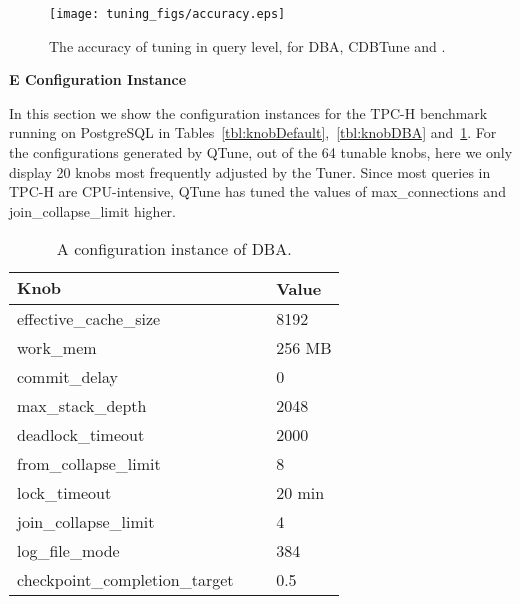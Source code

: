 \begin{figure}[htb]
\texttt{[image: tuning\_figs/accuracy.eps]}
\vspace{-2em}
\caption{The accuracy of tuning in query level, for DBA, CDBTune and \oursys .}
\label{fig:accuracy}
\vspace{-0.5em}
\end{figure} 


\vspace{1.0 em}
\noindent \textbf{\large E Configuration Instance}
\label{sec:config}

In this section we show the configuration instances for the TPC-H benchmark running on PostgreSQL in Tables~\ref{tbl:knobDefault},~\ref{tbl:knobDBA} and~\ref{tbl:knobQTune}. For the configurations generated by QTune, out of the 64 tunable knobs, here we only display 20 knobs most frequently adjusted by the Tuner. Since most queries in TPC-H are CPU-intensive,  QTune has tuned the values of max\_connections and join\_collapse\_limit higher.

\begin{table}[H]
\caption{A configuration instance of DBA.}
\centering  
	\begin{tabular}{lll}\hline
	$\textbf{Knob}$ & & \textbf{Value} \\\hline
	effective\_cache\_size & $\ \ \ $ & 8192 \\
	work\_mem & $\ \ \ $ & 256 MB \\
	commit\_delay & $\ \ \ $ & 0 \\
	max\_stack\_depth & $\ \ \ $ & 2048 \\
	deadlock\_timeout & $\ \ \ $ & 2000 \\
	from\_collapse\_limit & $\ \ \ $ & 8 \\
	lock\_timeout & $\ \ \ $ & 20 min \\
	join\_collapse\_limit & $\ \ \ $ & 4 \\	
	log\_file\_mode & $\ \ \ $ & 384 \\
	checkpoint\_completion\_target & $\ \ \ $ & 0.5 \\\hline

	\end{tabular} 
\label{tbl:knobQTune}    
\end{table} 

